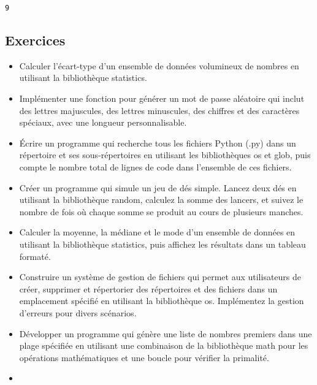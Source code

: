 \documentclass[11pt]{article}
\makeatletter
\newcommand{\boxspacing}{\kern\kvtcb@left@rule\kern\kvtcb@boxsep}
\newcommand{\prompt}[4]{
        {\ttfamily\llap{{\color{#2}[#3]:\hspace{3pt}#4}}\vspace{-\baselineskip}}
    }
\makeatother
\begin{document}
            \begin{tcolorbox}[breakable, size=fbox, boxrule=.5pt, pad at break*=1mm, opacityfill=0]
\prompt{Out}{outcolor}{4}{\boxspacing}
\begin{Verbatim}[commandchars=\\\{\}]
9
\end{Verbatim}
\end{tcolorbox}
        
    \hypertarget{exercices}{%
\subsection{Exercices}\label{exercices}}

\begin{itemize}
\item
  Calculer l'écart-type d'un ensemble de données volumineux de nombres
  en utilisant la bibliothèque statistics.
\item
  Implémenter une fonction pour générer un mot de passe aléatoire qui
  inclut des lettres majuscules, des lettres minuscules, des chiffres et
  des caractères spéciaux, avec une longueur personnalisable.
\item
  Écrire un programme qui recherche tous les fichiers Python (.py) dans
  un répertoire et ses sous-répertoires en utilisant les bibliothèques
  os et glob, puis compte le nombre total de lignes de code dans
  l'ensemble de ces fichiers.
\item
  Créer un programme qui simule un jeu de dés simple. Lancez deux dés en
  utilisant la bibliothèque random, calculez la somme des lancers, et
  suivez le nombre de fois où chaque somme se produit au cours de
  plusieurs manches.
\item
  Calculer la moyenne, la médiane et le mode d'un ensemble de données en
  utilisant la bibliothèque statistics, puis affichez les résultats dans
  un tableau formaté.
\item
  Construire un système de gestion de fichiers qui permet aux
  utilisateurs de créer, supprimer et répertorier des répertoires et des
  fichiers dans un emplacement spécifié en utilisant la bibliothèque os.
  Implémentez la gestion d'erreurs pour divers scénarios.
\item
  Développer un programme qui génère une liste de nombres premiers dans
  une plage spécifiée en utilisant une combinaison de la bibliothèque
  math pour les opérations mathématiques et une boucle pour vérifier la
  primalité.
\item

\end{itemize}
\end{document}
